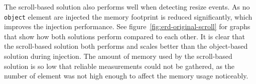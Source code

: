 \documentclass{acm_proc_article-sp}
\newcommand{\code}[1]{\texttt{#1}}
\newcommand{\glspl}[1]{#1}
\newcommand{\gls}[1]{#1}
\begin{document}

      The scroll-based solution also performs well when detecting resize events.
      As no \code{object} \glspl{element} are injected the memory footprint is reduced significantly, which improves the injection performance.
      See figure~\ref{fig:erd-original-scroll} for graphs that show how both solutions perform compared to each other.
      It is clear that the scroll-based solution both performs and scales better than the object-based solution during injection.        
      The amount of memory used by the scroll-based solution is so low that reliable measurements could not be gathered, as the number of \glspl{element} was not high enough to affect the memory usage noticeably.
\end{document}
